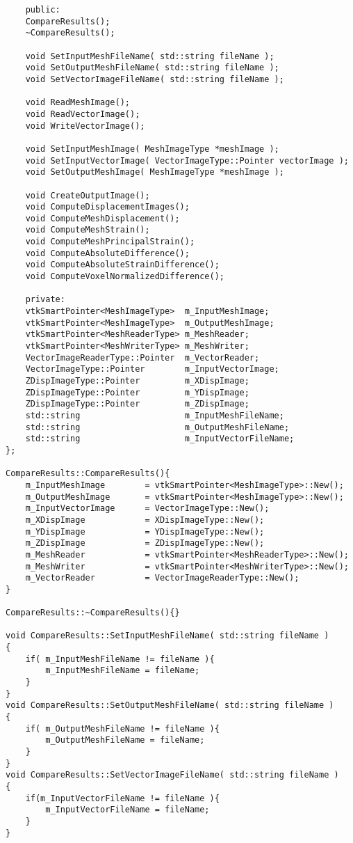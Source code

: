 \begin{lstlisting}
	public:
	CompareResults();
	~CompareResults();
	
	void SetInputMeshFileName( std::string fileName );
	void SetOutputMeshFileName( std::string fileName );
	void SetVectorImageFileName( std::string fileName );
	
	void ReadMeshImage();
	void ReadVectorImage();
	void WriteVectorImage();
	
	void SetInputMeshImage( MeshImageType *meshImage );
	void SetInputVectorImage( VectorImageType::Pointer vectorImage );
	void SetOutputMeshImage( MeshImageType *meshImage );
	
	void CreateOutputImage();
	void ComputeDisplacementImages();
	void ComputeMeshDisplacement();
	void ComputeMeshStrain();
	void ComputeMeshPrincipalStrain();
	void ComputeAbsoluteDifference();
	void ComputeAbsoluteStrainDifference();
	void ComputeVoxelNormalizedDifference();
	
	private:
	vtkSmartPointer<MeshImageType>	m_InputMeshImage;
	vtkSmartPointer<MeshImageType>	m_OutputMeshImage;
	vtkSmartPointer<MeshReaderType>	m_MeshReader;
	vtkSmartPointer<MeshWriterType>	m_MeshWriter;
	VectorImageReaderType::Pointer	m_VectorReader;
	VectorImageType::Pointer		m_InputVectorImage;
	ZDispImageType::Pointer			m_XDispImage;
	ZDispImageType::Pointer			m_YDispImage;
	ZDispImageType::Pointer			m_ZDispImage;
	std::string						m_InputMeshFileName;
	std::string						m_OutputMeshFileName;
	std::string						m_InputVectorFileName;
};

CompareResults::CompareResults(){
	m_InputMeshImage		= vtkSmartPointer<MeshImageType>::New();
	m_OutputMeshImage		= vtkSmartPointer<MeshImageType>::New();
	m_InputVectorImage		= VectorImageType::New();
	m_XDispImage			= XDispImageType::New();
	m_YDispImage			= YDispImageType::New();
	m_ZDispImage			= ZDispImageType::New();
	m_MeshReader			= vtkSmartPointer<MeshReaderType>::New();
	m_MeshWriter			= vtkSmartPointer<MeshWriterType>::New();
	m_VectorReader			= VectorImageReaderType::New();
}

CompareResults::~CompareResults(){}

void CompareResults::SetInputMeshFileName( std::string fileName )
{
	if( m_InputMeshFileName != fileName ){
		m_InputMeshFileName = fileName;
	}
}
void CompareResults::SetOutputMeshFileName( std::string fileName )
{
	if( m_OutputMeshFileName != fileName ){
		m_OutputMeshFileName = fileName;
	}
}
void CompareResults::SetVectorImageFileName( std::string fileName )
{
	if(m_InputVectorFileName != fileName ){
		m_InputVectorFileName = fileName;
	}
}


\end{lstlisting}
